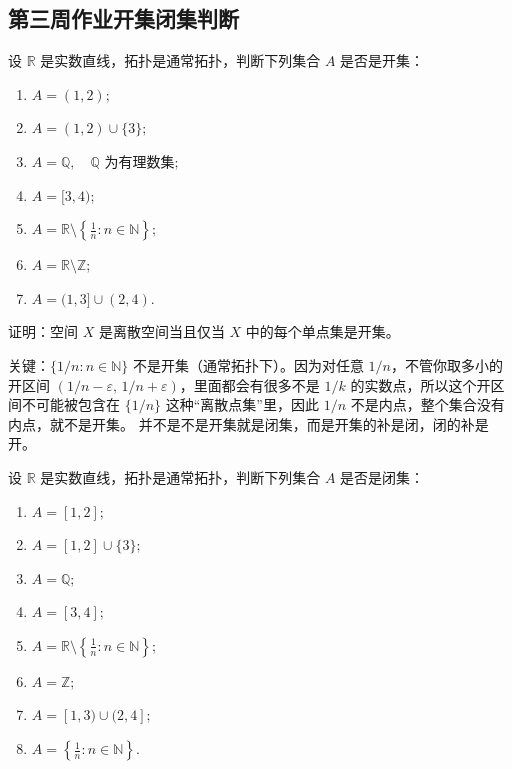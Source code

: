 \subsection*{第三周作业开集闭集判断}

\begin{exercise}
设 $\mathbb{R}$ 是实数直线，拓扑是通常拓扑，判断下列集合 $A$ 是否是开集：  
\begin{enumerate}
  \item $A = (1,2);$
  \item $A = (1,2) \cup \{3\};$
  \item $A = \mathbb{Q}, \quad \mathbb{Q} \text{ 为有理数集};$
  \item $A = [3,4);$
  \item $A = \mathbb{R}\setminus\left\{\tfrac{1}{n} : n\in\mathbb{N}\right\};$
  \item $A = \mathbb{R}\setminus\mathbb{Z};$
  \item $A = (1,3]\cup(2,4).$
\end{enumerate}
\end{exercise}

\begin{exercise}
证明：空间 $X$ 是离散空间当且仅当 $X$ 中的每个单点集是开集。
\end{exercise}
\begin{dxtips}
    关键：$\{1/n:n\in\mathbb{N}\}$ 不是开集（通常拓扑下）。因为对任意 $1/n$，不管你取多小的开区间 $(1/n-\varepsilon,\,1/n+\varepsilon)$，里面都会有很多不是 $1/k$ 的实数点，所以这个开区间不可能被包含在 $\{1/n\}$ 这种“离散点集”里，因此 $1/n$ 不是内点，整个集合没有内点，就不是开集。
    并不是不是开集就是闭集，而是开集的补是闭，闭的补是开。
\end{dxtips}
\begin{exercise}
设 $\mathbb{R}$ 是实数直线，拓扑是通常拓扑，判断下列集合 $A$ 是否是闭集：  
\begin{enumerate}
  \item $A = [1,2];$
  \item $A = [1,2]\cup\{3\};$
  \item $A = \mathbb{Q};$
  \item $A = [3,4];$
  \item $A = \mathbb{R}\setminus\left\{\tfrac{1}{n}:n\in\mathbb{N}\right\};$
  \item $A = \mathbb{Z};$
  \item $A = [1,3)\cup(2,4];$
  \item $A = \left\{\tfrac{1}{n}:n\in\mathbb{N}\right\}.$
\end{enumerate}
\end{exercise}

